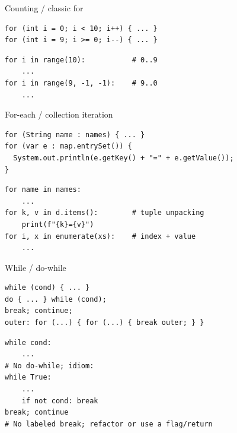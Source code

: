 \documentclass[10pt]{article}
\begin{document}
\begin{construct}{Counting / classic for}
\noindent
\begin{minipage}[t]{0.485\linewidth}
\begin{lstlisting}[style=java, title=Java]
for (int i = 0; i < 10; i++) { ... }
for (int i = 9; i >= 0; i--) { ... }
\end{lstlisting}
\end{minipage}\hfill
\begin{minipage}[t]{0.485\linewidth}
\begin{lstlisting}[style=python, title=Python]
for i in range(10):           # 0..9
    ...
for i in range(9, -1, -1):    # 9..0
    ...
\end{lstlisting}
\end{minipage}
\end{construct}

\begin{construct}{For-each / collection iteration}
\noindent
\begin{minipage}[t]{0.485\linewidth}
\begin{lstlisting}[style=java, title=Java]
for (String name : names) { ... }
for (var e : map.entrySet()) {
  System.out.println(e.getKey() + "=" + e.getValue());
}
\end{lstlisting}
\end{minipage}\hfill
\begin{minipage}[t]{0.485\linewidth}
\begin{lstlisting}[style=python, title=Python]
for name in names:
    ...
for k, v in d.items():        # tuple unpacking
    print(f"{k}={v}")
for i, x in enumerate(xs):    # index + value
    ...
\end{lstlisting}
\end{minipage}
\end{construct}

\begin{construct}{While / do-while}
\noindent
\begin{minipage}[t]{0.485\linewidth}
\begin{lstlisting}[style=java, title=Java]
while (cond) { ... }
do { ... } while (cond);
break; continue;
outer: for (...) { for (...) { break outer; } }
\end{lstlisting}
\end{minipage}\hfill
\begin{minipage}[t]{0.485\linewidth}
\begin{lstlisting}[style=python, title=Python]
while cond:
    ...
# No do-while; idiom:
while True:
    ...
    if not cond: break
break; continue
# No labeled break; refactor or use a flag/return
\end{lstlisting}
\end{minipage}
\end{construct}
\end{document}
